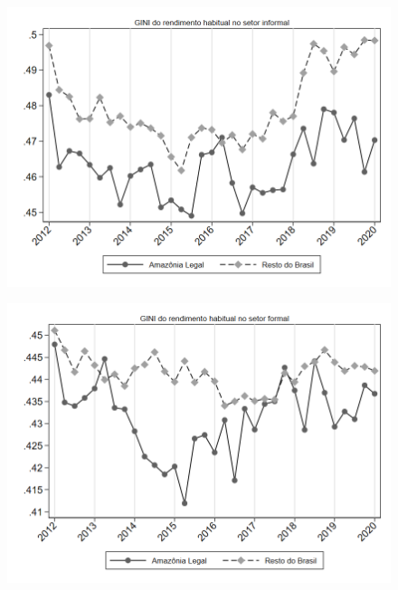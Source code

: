 \begin{frame}[label=_estrutura_renda_gini_informal]{}
\textit{\hyperlink{_estrutura_renda}{}}
\begin{figure}
  \centering
  \includegraphics[width=1.0\linewidth]{../../analysis/output/estrutura_renda/_estrutura_renda_gini_informal.png}
  \caption{}
  \label{fig:_estrutura_renda_gini_informal}
\end{figure}
\end{frame}



\begin{frame}[label=_estrutura_renda_gini_formal]{}
\textit{\hyperlink{_estrutura_renda}{}}
\begin{figure}
  \centering
  \includegraphics[width=1.0\linewidth]{../../analysis/output/estrutura_renda/_estrutura_renda_gini_formal.png}
  \caption{}
  \label{fig:_estrutura_renda_gini_formal}
\end{figure}
\end{frame}
